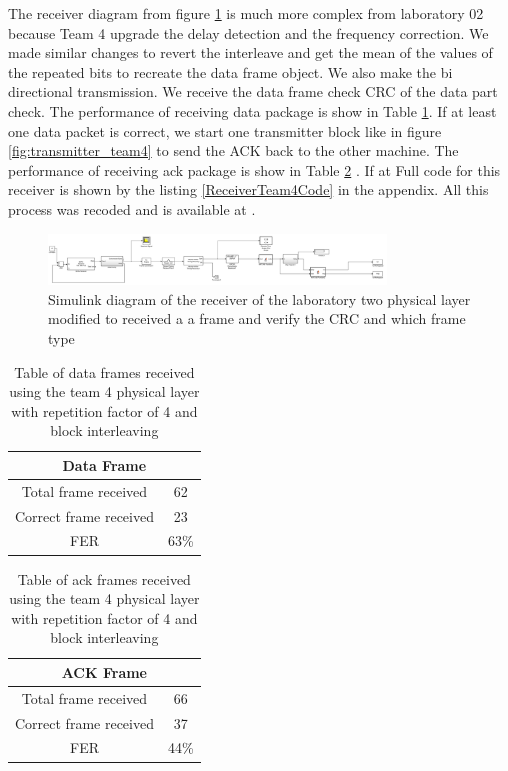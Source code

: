 The receiver diagram from figure \ref{fig:receiver_team4} is much more complex from laboratory 02 because Team 4 upgrade the delay detection and the frequency correction.
We made similar changes to revert the interleave and get the mean of the values of the repeated bits to recreate the data frame object.
We also make the bi directional transmission. We receive the data frame check CRC of the data part check. The performance of receiving data package is show in Table \ref{tab:team4data}. If at least one data packet is correct, we start one transmitter block like in figure \ref{fig:transmitter_team4} to send the ACK back to the other machine. The performance of receiving ack package is show in Table \ref{tab:team4ack} . If at Full code for this receiver is shown by the listing \ref{ReceiverTeam4Code} in the appendix. All this process was recoded and is available at \cite{videodemo}. 
 

\begin{figure}[ht]
    \centering
    \includegraphics[width=0.8\textwidth]{receiver_team4.PNG}
    \caption{Simulink diagram of the receiver of the laboratory two physical layer modified to received a a frame and verify the CRC and which frame type }
    \label{fig:receiver_team4}
\end{figure}

\begin{table}[ht]
	\centering
		\begin{tabular}{| c | c | }
		\hline
			\multicolumn{2}{|c|}{Data Frame}\\
		\hline                       
			 Total frame received & 62\\
			 Correct frame received& 23\\
		\hline
			FER & 63\%\\
		\hline
		\end{tabular}
	\caption{Table of data frames received using the team 4 physical layer with repetition factor of 4 and block interleaving}
	\label{tab:team4data}
	\end{table}

\begin{table}[ht]
	\centering
		\begin{tabular}{| c | c | }
		\hline
			\multicolumn{2}{|c|}{ACK Frame}\\ 
		\hline                       
			 Total frame received & 66\\
			 Correct frame received& 37\\
		\hline
			FER & 44\%\\
		\hline
		\end{tabular}
	\caption{Table of ack frames received using the team 4 physical layer with repetition factor of 4 and block interleaving}
	\label{tab:team4ack}
	\end{table}
